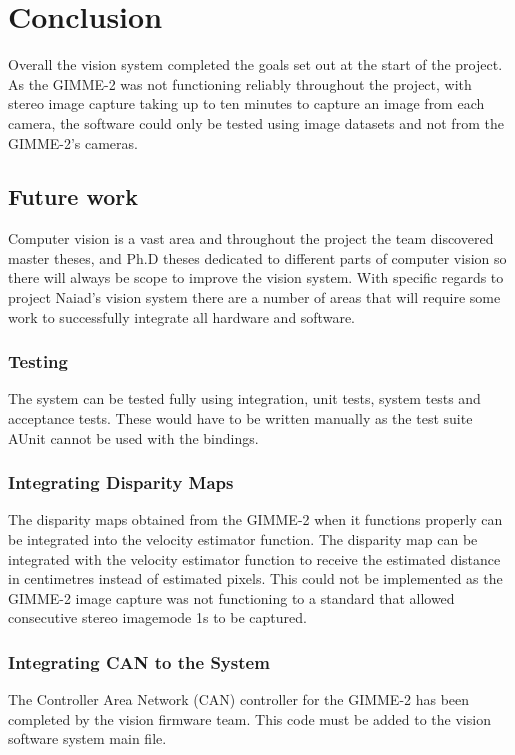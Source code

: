 \section{Conclusion}\label{sec:conclusion}
Overall the vision system completed the goals set out at the start of the project. As the GIMME-2 was not functioning reliably throughout the project, with stereo image capture taking up to ten minutes to capture an image from each camera, the software could only be tested using image datasets and not from the GIMME-2's cameras. 
\subsection{Future work}
Computer vision is a vast area and throughout the project the team discovered master theses, and Ph.D theses dedicated to different parts of computer vision so there will always be scope to improve the vision system. With specific regards to project Naiad's vision system there are a number of areas that will require some work to successfully integrate all hardware and software.
\subsubsection{Testing}
The system can be tested fully using integration, unit tests, system tests and acceptance tests. These would have to be written manually as the test suite AUnit cannot be used with the bindings.

\subsubsection{Integrating Disparity Maps}
The disparity maps obtained from the GIMME-2 when it functions properly can be integrated into the velocity estimator function.
The disparity map can be integrated with the velocity estimator function to receive the estimated distance in centimetres instead of estimated pixels. This could not be implemented as the GIMME-2 image capture was not functioning to a standard that allowed consecutive stereo imagemode 1s to be captured.

\subsubsection{Integrating CAN to the System}
The Controller Area Network (CAN) controller for the GIMME-2 has been completed by the vision firmware team. This code must be added to the vision software system main file.

